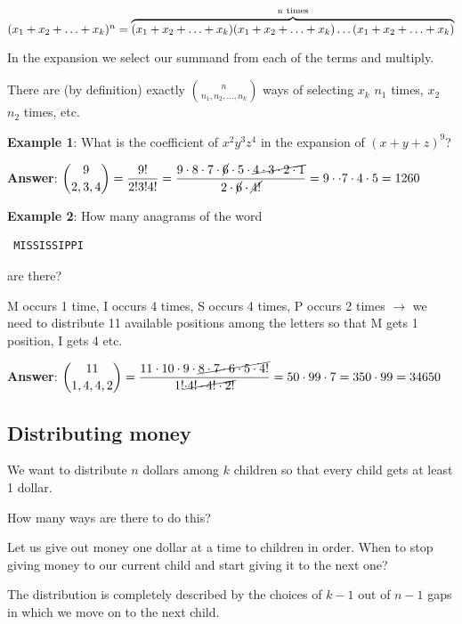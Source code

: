 \documentclass[9pt, letterpaper, oneside]{article}
\begin{document}
$(x_1 + x_2 + \ldots + x_k)^n = \overbrace{(x_1 + x_2 + \ldots + x_k)(x_1 + x_2 + \ldots + x_k) \ldots (x_1 + x_2 + \ldots + x_k) }^{\rm n \ times} $


In the expansion we select our summand from each of the terms and multiply.

There are (by definition) exactly ${n \choose n_1, n_2, \ldots, n_k}$ ways of selecting $x_k$ $n_1$ times, $x_2$ $n_2$ times, etc.

\textbf{Example 1}: What is the coefficient of $x^2y^3z^4$ in the expansion of $(x + y + z)^9$?

\textbf{Answer}: $\displaystyle {9 \choose 2, 3, 4} = \frac{9!}{2!3!4!} = \frac{9 \cdot 8 \cdot 7 \cdot \cancel{6} \cdot 5 \cdot \cancel{4 \cdot 3 \cdot 2 \cdot 1}}{2\cdot \cancel{6} \cdot \cancel{4!}} = 9 \cdot \cdot 7 \cdot 4 \cdot 5 = 1260$

\textbf{Example 2}: How many anagrams of the word \begin{verbatim} MISSISSIPPI \end{verbatim} are there?

M occurs 1 time, I occurs 4 times, S occurs 4 times, P occurs 2 times $\to$ we need to distribute 11 available positions among the letters so that M gets 1 position, I gets 4 etc.

\textbf{Answer}: $\displaystyle {11 \choose 1, 4, 4, 2} = \frac{11 \cdot 10 \cdot 9 \cdot \cancel{8 \cdot 7 \cdot 6 \cdot 5 \cdot 4!}}{1! \cancel{\cdot 4! \cdot 4! \cdot 2!}}= 50 \cdot 99 \cdot 7 = 350 \cdot 99 = 34650$


\subsection{Distributing money}

We want to distribute $n$ dollars among $k$ children so that every child gets at least 1 dollar.

How many ways are there to do this?

Let us give out money one dollar at a time to children in order. When to stop giving money to our current child and start giving it to the next one? 

The distribution is completely described by the choices of $k - 1$ out of $n - 1$ gaps in which we move on to the next child.
\end{document}
